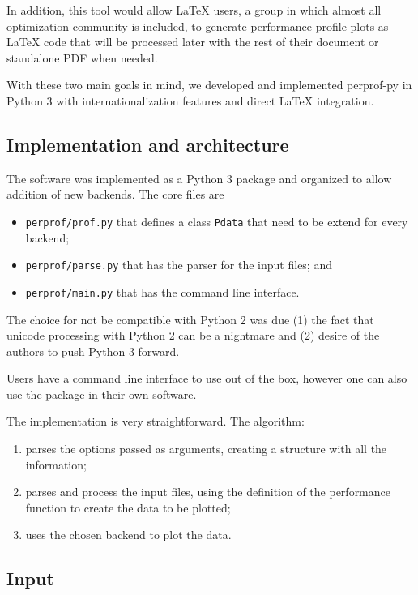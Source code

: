     In addition, this tool would allow LaTeX users, a group in which almost
    all optimization community is included, to generate performance profile
    plots as LaTeX code that will be processed later
    with the rest of their document
    or standalone PDF when needed.

    With these two main goals in mind, we developed and implemented perprof-py
    in Python 3 with internationalization features and direct LaTeX
    integration.

\subsection*{Implementation and architecture}

    The software was implemented as a Python 3 package
    and organized to allow addition of new backends.
    The core files are
    \begin{itemize}
      \item {\tt perprof/prof.py} that defines a class {\tt Pdata} that need to
        be extend for every backend;
      \item {\tt perprof/parse.py} that has the parser for the input files; and
      \item {\tt perprof/main.py} that has the command line interface.
    \end{itemize}

    The choice for not be compatible with Python 2
    was due (1) the fact that unicode processing with Python 2 can be a nightmare and
    (2) desire of the authors to push Python 3 forward.

    Users have a command line interface to use out of the box,
    however one can also use the package in their own software.

    The implementation is very straightforward. The algorithm:
    \begin{enumerate}
      \item parses the options passed as arguments, creating a
        structure with all the information;
      \item parses and process the input files, using the definition
        of the performance function to create the data to be plotted;
      \item uses the chosen backend to plot the data.
    \end{enumerate}

\subsection*{Input}

